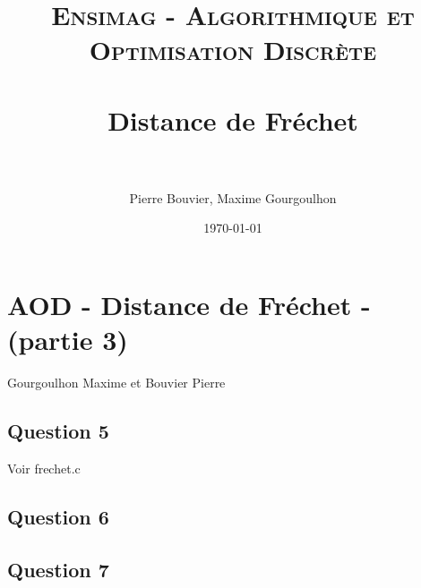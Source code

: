 \documentclass[paper=a4, fontsize=11pt]{scrartcl} %
\title{
\normalfont \normalsize
\textsc{Ensimag - Algorithmique et Optimisation Discrète} \\ [25pt] %
\horrule{0.5pt} \\[0.4cm] %
\huge Distance de Fréchet \\ %
\horrule{2pt} \\[0.5cm] %
}
\author{Pierre Bouvier, Maxime Gourgoulhon} %
\date{\normalsize\today} %
\begin{document}


\section*{AOD - Distance de Fréchet - (partie 3)}
Gourgoulhon Maxime et Bouvier Pierre


\subsection*{Question 5}

Voir frechet.c


\subsection*{Question 6}

\subsection*{Question 7}
\end{document}
